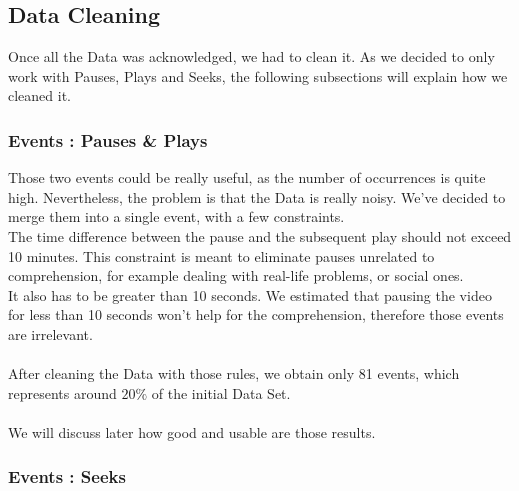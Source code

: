 \documentclass[11pt,a4paper]{article}
\begin{document}
\subsection{Data Cleaning}

Once all the Data was acknowledged, we had to clean it. As we decided to only work with Pauses, Plays and Seeks, the following subsections will explain how we cleaned it.


\subsubsection{Events : Pauses \& Plays}

Those two events could be really useful, as the number of occurrences is quite high. Nevertheless, the problem is that the Data is really noisy. We've decided to merge them into a single event, with a few constraints. \\
The time difference between the pause and the subsequent play should not exceed 10 minutes. This constraint is meant to eliminate pauses unrelated to comprehension, for example dealing with real-life problems, or social ones. \\
It also has to be greater than 10 seconds. We estimated that pausing the video for less than 10 seconds won't help for the comprehension, therefore those events are irrelevant.\\
\\
After cleaning the Data with those rules, we obtain only 81 events, which represents around $20\%$ of the initial Data Set. \\
\\
We will discuss later how good and usable are those results.

\subsubsection{Events : Seeks}
\end{document}
